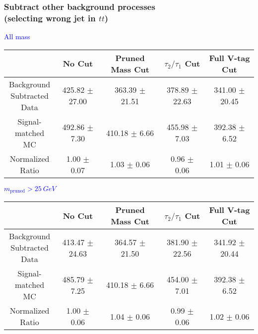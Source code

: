 \documentclass{beamer}
\begin{document}
\begin{frame}
  \frametitle{Subtract other background processes \\ (selecting wrong jet in $tt$)}
  \begin{adjustwidth}{-1.5em}{-1.5em}
    \centering
    \vspace{6pt}
    \textcolor{blue}{All mass}
    \vspace{6pt}

    {\scriptsize
      \begin{tabular}{c | c | c | c | c}
\hline
 & No Cut & Pruned Mass Cut & $\tau_2/\tau_1$ Cut & Full V-tag Cut \\
\hline
\makecell{Background \\ Subtracted \\ Data} & 425.82 $\pm$ 27.00 & 363.39 $\pm$ 21.51 & 378.89 $\pm$ 22.63 & 341.00 $\pm$ 20.45 \\
\makecell{Signal-\\ matched MC} & 492.86 $\pm$ 7.30 & 410.18 $\pm$ 6.66 & 455.98 $\pm$ 7.03 & 392.38 $\pm$ 6.52 \\
\hline
\makecell{Normalized \\ Ratio} & 1.00 $\pm$ 0.07 & 1.03 $\pm$ 0.06 & 0.96 $\pm$ 0.06 & 1.01 $\pm$ 0.06 \\
\hline
      \end{tabular}
    }

    \vspace{6pt}
    \textcolor{blue}{$m_\text{pruned} > \SI{25}{GeV}$}
    \vspace{6pt}

    {\scriptsize
      \begin{tabular}{c | c | c | c | c}
\hline
 & No Cut & Pruned Mass Cut & $\tau_2/\tau_1$ Cut & Full V-tag Cut \\
\hline
\makecell{Background \\ Subtracted \\ Data} & 413.47 $\pm$ 24.63 & 364.57 $\pm$ 21.50 & 381.90 $\pm$ 22.56 & 341.92 $\pm$ 20.44 \\
\makecell{Signal-\\ matched MC} & 485.79 $\pm$ 7.25 & 410.18 $\pm$ 6.66 & 454.00 $\pm$ 7.01 & 392.38 $\pm$ 6.52 \\
\hline
\makecell{Normalized \\ Ratio} & 1.00 $\pm$ 0.06 & 1.04 $\pm$ 0.06 & 0.99 $\pm$ 0.06 & 1.02 $\pm$ 0.06 \\
\hline
      \end{tabular}
    }
  \end{adjustwidth}
\end{frame}
\end{document}
